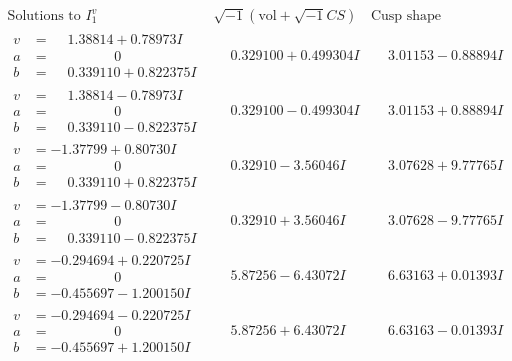 \documentclass[1p]{elsarticle_modified}
\theoremstyle{definition}
\newcommand{\I}{\sqrt{-1}}
\begin{document}
$$\begin{array}{c|c|c}  
\text{Solutions to }I^v_{1}& \I (\text{vol} + \sqrt{-1}CS) & \text{Cusp shape}\\
 \hline 
\begin{aligned}
v &= \phantom{-}1.38814 + 0.78973 I \\
a &= \phantom{-0.000000 } 0 \\
b &= \phantom{-}0.339110 + 0.822375 I\end{aligned}
 & \phantom{-}0.329100 + 0.499304 I & \phantom{-}3.01153 - 0.88894 I \\ \hline\begin{aligned}
v &= \phantom{-}1.38814 - 0.78973 I \\
a &= \phantom{-0.000000 } 0 \\
b &= \phantom{-}0.339110 - 0.822375 I\end{aligned}
 & \phantom{-}0.329100 - 0.499304 I & \phantom{-}3.01153 + 0.88894 I \\ \hline\begin{aligned}
v &= -1.37799 + 0.80730 I \\
a &= \phantom{-0.000000 } 0 \\
b &= \phantom{-}0.339110 + 0.822375 I\end{aligned}
 & \phantom{-}0.32910 - 3.56046 I & \phantom{-}3.07628 + 9.77765 I \\ \hline\begin{aligned}
v &= -1.37799 - 0.80730 I \\
a &= \phantom{-0.000000 } 0 \\
b &= \phantom{-}0.339110 - 0.822375 I\end{aligned}
 & \phantom{-}0.32910 + 3.56046 I & \phantom{-}3.07628 - 9.77765 I \\ \hline\begin{aligned}
v &= -0.294694 + 0.220725 I \\
a &= \phantom{-0.000000 } 0 \\
b &= -0.455697 - 1.200150 I\end{aligned}
 & \phantom{-}5.87256 - 6.43072 I & \phantom{-}6.63163 + 0.01393 I \\ \hline\begin{aligned}
v &= -0.294694 - 0.220725 I \\
a &= \phantom{-0.000000 } 0 \\
b &= -0.455697 + 1.200150 I\end{aligned}
 & \phantom{-}5.87256 + 6.43072 I & \phantom{-}6.63163 - 0.01393 I \\ \hline\begin{aligned}

\end{aligned}
\end{array}$$
\end{document}
